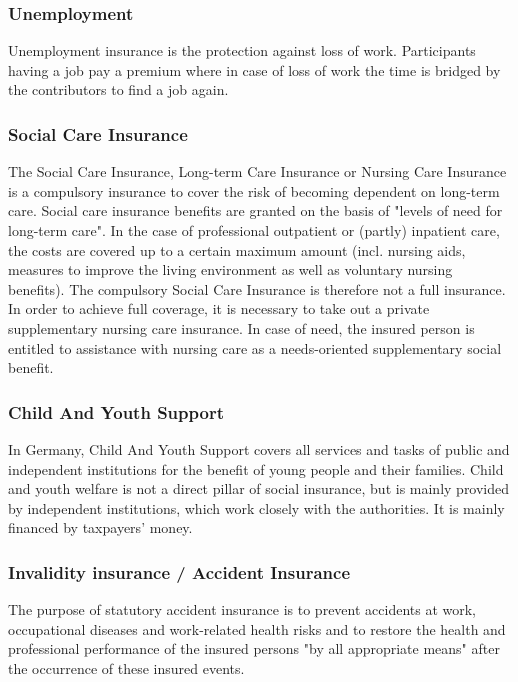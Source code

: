 \subsubsection*{Unemployment}
Unemployment insurance is the protection against loss of work. Participants having a job pay a premium where in case of loss of work the time is bridged by the contributors to find a job again.

\subsubsection*{Social Care Insurance}

The Social Care Insurance, Long-term Care Insurance or Nursing Care Insurance  is a compulsory insurance to cover the risk of becoming dependent on long-term care. Social care insurance benefits are granted on the basis of "levels of need for long-term care". In the case of professional outpatient or (partly) inpatient care, the costs are covered up to a certain maximum amount (incl. nursing aids, measures to improve the living environment as well as voluntary nursing benefits). The compulsory Social Care Insurance is therefore not a full insurance. In order to achieve full coverage, it is necessary to take out a private supplementary nursing care insurance. In case of need, the insured person is entitled to assistance with nursing care as a needs-oriented supplementary social benefit.

\subsubsection*{Child And Youth Support}
In Germany, Child And Youth Support covers all services and tasks of public and independent institutions for the benefit of young people and their families. Child and youth welfare is not a direct pillar of social insurance, but is mainly provided by independent institutions, which work closely with the authorities. It is mainly financed by taxpayers' money. 

\subsubsection*{Invalidity insurance / Accident Insurance}
The purpose of statutory accident insurance is to prevent accidents at work, occupational diseases and work-related health risks and to restore the health and professional performance of the insured persons "by all appropriate means" after the occurrence of these insured events.


